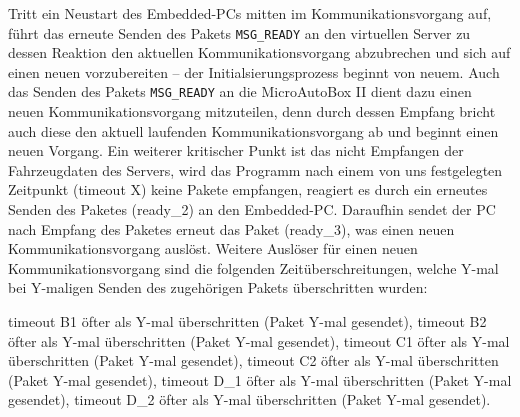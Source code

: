 \documentclass[fontsize = 12pt, paper = a4]{scrreprt}
\begin{document}
Tritt ein Neustart des Embedded-PCs mitten im Kommunikationsvorgang auf, führt das erneute Senden des Pakets \texttt{MSG\_READY} an den virtuellen Server zu dessen Reaktion den aktuellen Kommunikationsvorgang abzubrechen und sich auf einen neuen vorzubereiten -- der Initialsierungsprozess beginnt von neuem. Auch das Senden des Pakets \texttt{MSG\_READY} an die MicroAutoBox II dient dazu einen neuen Kommunikationsvorgang mitzuteilen, denn durch dessen Empfang bricht auch diese den aktuell laufenden Kommunikationsvorgang ab und beginnt einen neuen Vorgang. Ein weiterer kritischer Punkt ist das nicht Empfangen der Fahrzeugdaten des Servers, wird das Programm nach einem von uns festgelegten Zeitpunkt (timeout X) keine Pakete empfangen, reagiert es durch ein erneutes Senden des Paketes (ready\_2) an den Embedded-PC. Daraufhin sendet der PC nach Empfang des Paketes erneut das Paket (ready\_3), was einen neuen Kommunikationsvorgang auslöst. Weitere Auslöser für einen neuen Kommunikationsvorgang sind die folgenden Zeitüberschreitungen, welche Y-mal bei Y-maligen Senden des zugehörigen Pakets überschritten wurden:

timeout B1 öfter als Y-mal überschritten (Paket Y-mal gesendet),
timeout B2 öfter als Y-mal überschritten (Paket Y-mal gesendet),
timeout C1 öfter als Y-mal überschritten (Paket Y-mal gesendet),
timeout C2 öfter als Y-mal überschritten (Paket Y-mal gesendet),
timeout D\_1 öfter als Y-mal überschritten (Paket Y-mal gesendet),
timeout D\_2 öfter als Y-mal überschritten (Paket Y-mal gesendet).
\end{document}

